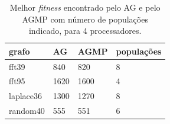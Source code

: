 \documentclass[fleqn,10pt]{SelfArx} %
\begin{document}
\begin{table}[h]
\centering
\caption{Melhor \textit{fitness} encontrado pelo AG e pelo AGMP com número de populações indicado, para 4 processadores.}
\label{tab:comp}
\begin{tabular}{|l|l|l|l|}
\hline
\textbf{grafo}     & \textbf{AG}   & \textbf{AGMP} & \textbf{populações} \\ \hline
fft39     & 840  & 820  & 8          \\ \hline
fft95     & 1620 & 1600 & 4          \\ \hline
laplace36 & 1300 & 1270 & 8          \\ \hline
random40  & 555  & 551  & 6          \\ \hline
\end{tabular}
\end{table}


\end{document}
